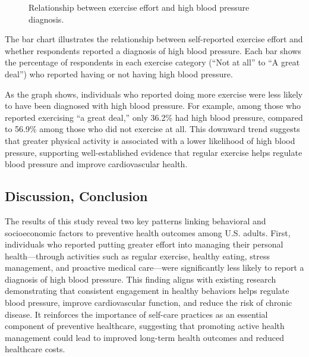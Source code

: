 \documentclass[
  letterpaper,
  DIV=11,
  numbers=noendperiod]{scrartcl}
\begin{document}
\begin{figure}


\caption{\label{fig-exercise}Relationship between exercise effort and
high blood pressure diagnosis.}

\end{figure}%

The bar chart illustrates the relationship between self-reported
exercise effort and whether respondents reported a diagnosis of high
blood pressure. Each bar shows the percentage of respondents in each
exercise category (``Not at all'' to ``A great deal'') who reported
having or not having high blood pressure.

As the graph shows, individuals who reported doing more exercise were
less likely to have been diagnosed with high blood pressure. For
example, among those who reported exercising ``a great deal,'' only
36.2\% had high blood pressure, compared to 56.9\% among those who did
not exercise at all. This downward trend suggests that greater physical
activity is associated with a lower likelihood of high blood pressure,
supporting well-established evidence that regular exercise helps
regulate blood pressure and improve cardiovascular health.

\subsection{Discussion, Conclusion}\label{sec-discussino}

The results of this study reveal two key patterns linking behavioral and
socioeconomic factors to preventive health outcomes among U.S. adults.
First, individuals who reported putting greater effort into managing
their personal health---through activities such as regular exercise,
healthy eating, stress management, and proactive medical care---were
significantly less likely to report a diagnosis of high blood pressure.
This finding aligns with existing research demonstrating that consistent
engagement in healthy behaviors helps regulate blood pressure, improve
cardiovascular function, and reduce the risk of chronic disease. It
reinforces the importance of self-care practices as an essential
component of preventive healthcare, suggesting that promoting active
health management could lead to improved long-term health outcomes and
reduced healthcare costs.
\end{document}
